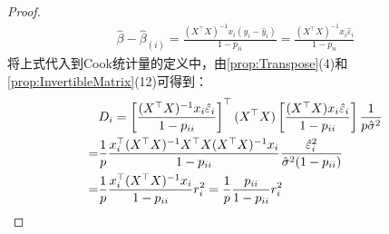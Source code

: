 \begin{proof}
\begin{gather*}
		\hat{\beta}-\hat{\beta}_{(i)}=\frac{(X^{\top}X)^{-1}x_i(y_i-\hat{y}_i)}{1-p_{ii}}=\frac{(X^{\top}X)^{-1}x_i\hat{\varepsilon}_i}{1-p_{ii}} 
	\end{gather*}
	将上式代入到Cook统计量的定义中，由\cref{prop:Transpose}(4)和\cref{prop:InvertibleMatrix}(12)可得到：
	\begin{align*}
		&D_i=\left[\frac{(X^{\top}X)^{-1}x_i\hat{\varepsilon}_i}{1-p_{ii}}\right]^{\top}(X^{\top}X)\left[\frac{(X^{\top}X)x_i\hat{\varepsilon}_i}{1-p_{ii}}\right]\frac{1}{p\hat{\sigma}^2} \\
		=&\frac{1}{p}\frac{x_i^{\top}(X^{\top}X)^{-1}X^{\top}X(X^{\top}X)^{-1}x_i}{1-p_{ii}}\frac{\hat{\varepsilon}_i^2}{\hat{\sigma}^2(1-p_{ii})} \\
		=&\frac{1}{p}\frac{x_i^{\top}(X^{\top}X)^{-1}x_i}{1-p_{ii}}r_i^2=\frac{1}{p}\frac{p_{ii}}{1-p_{ii}}r_i^2\qedhere
	\end{align*}
\end{proof}

